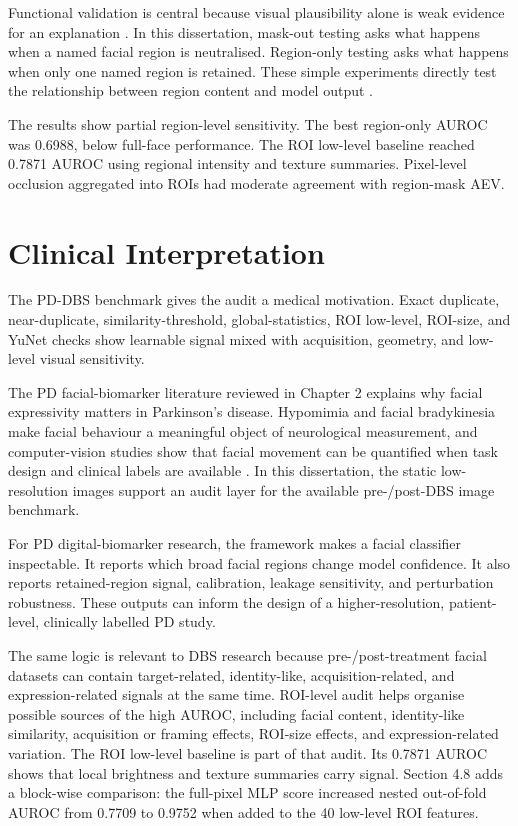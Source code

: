 Functional validation is central because visual plausibility alone is weak evidence for an explanation  . In this dissertation, mask-out testing asks what happens when a named facial region is neutralised. Region-only testing asks what happens when only one named region is retained. These simple experiments directly test the relationship between region content and model output  .


The results show partial region-level sensitivity. The best region-only AUROC was 0.6988, below full-face performance. The ROI low-level baseline reached 0.7871 AUROC using regional intensity and texture summaries. Pixel-level occlusion aggregated into ROIs had moderate agreement with region-mask AEV.


\section{Clinical Interpretation}

The PD-DBS benchmark gives the audit a medical motivation. Exact duplicate, near-duplicate, similarity-threshold, global-statistics, ROI low-level, ROI-size, and YuNet checks show learnable signal mixed with acquisition, geometry, and low-level visual sensitivity.


The PD facial-biomarker literature reviewed in Chapter 2 explains why facial expressivity matters in Parkinson's disease. Hypomimia and facial bradykinesia make facial behaviour a meaningful object of neurological measurement, and computer-vision studies show that facial movement can be quantified when task design and clinical labels are available   . In this dissertation, the static low-resolution images support an audit layer for the available pre-/post-DBS image benchmark.


For PD digital-biomarker research, the framework makes a facial classifier inspectable. It reports which broad facial regions change model confidence. It also reports retained-region signal, calibration, leakage sensitivity, and perturbation robustness. These outputs can inform the design of a higher-resolution, patient-level, clinically labelled PD study.


The same logic is relevant to DBS research because pre-/post-treatment facial datasets can contain target-related, identity-like, acquisition-related, and expression-related signals at the same time. ROI-level audit helps organise possible sources of the high AUROC, including facial content, identity-like similarity, acquisition or framing effects, ROI-size effects, and expression-related variation. The ROI low-level baseline is part of that audit. Its 0.7871 AUROC shows that local brightness and texture summaries carry signal. Section 4.8 adds a block-wise comparison: the full-pixel MLP score increased nested out-of-fold AUROC from 0.7709 to 0.9752 when added to the 40 low-level ROI features.


